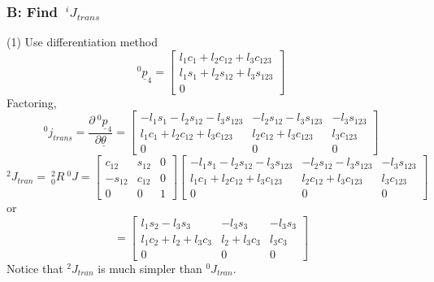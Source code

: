 \documentclass[]{article}
\begin{document}
\subsubsection{B: Find $\ \!^{i}J_{trans}$}
(1) Use differentiation method
\begin{displaymath}
^{0}\underline{p}_{4} = \left[ \begin{array}{c} l_{1}c_{1} + l_{2}c_{12} + l_{3}c_{123} \\ l_{1}s_{1} + l_{2}s_{12} + l_{3}s_{123} \\ 0 \end{array} \right]
\end{displaymath}
Factoring,
\begin{displaymath}
^{0}j_{trans} = \frac{\partial \ \!^{0}\underline{p}_{4}}{\partial \underline{\theta}} = \left[\begin{array}{ccc} -l_{1}s_{1}-l_{2}s_{12}-l_{3}s_{123} & -l_{2}s_{12}-l_{3}s_{123} & -l_{3}s_{123} \\ l_{1}c_{1} +l_{2}c_{12} +l_{3}c_{123} & l_{2}c_{12} + l_{3}c_{123} & l_{3}c_{123} \\ 0 & 0 & 0 \end{array}\right]
\end{displaymath}
\begin{displaymath}
	^{2}J_{tran} = \ \!^{2}_{0}R\ \!^{0}J = \left[\begin{array}{ccc} c_{12} & s_{12} & 0 \\ -s_{12} & c_{12} & 0 \\ 0 & 0 & 1 \end{array} \right] \left[\begin{array}{ccc} -l_{1}s_{1}-l_{2}s_{12}-l_{3}s_{123} & -l_{2}s_{12}-l_{3}s_{123} & -l_{3}s_{123} \\ l_{1}c_{1} +l_{2}c_{12} +l_{3}c_{123} & l_{2}c_{12} + l_{3}c_{123} & l_{3}c_{123} \\ 0 & 0 & 0 \end{array}\right]
\end{displaymath}
or
\begin{displaymath}
= \left[ \begin{array}{ccc} l_{1}s_{2} - l_{3}s_{3} & -l_{3}s_{3} & -l_{3}s_{3} \\ l_{1}c_{2}+l_{2} + l_{3}c_{3} & l_{2}+l_{3}c_{3} & l_{3}c_{3} \\ 0 & 0 & 0 \end{array} \right]
\end{displaymath}
Notice that $^{2}J_{tran}$ is much simpler than $^{0}J_{tran}$.
\end{document}
